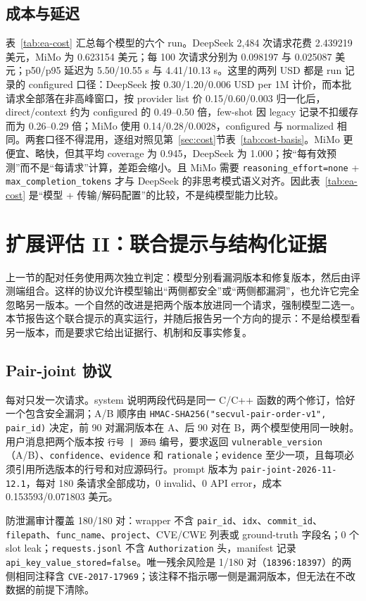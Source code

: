 \documentclass[conference]{IEEEtran}
\begin{document}
\subsection{成本与延迟}
表~\ref{tab:ea-cost} 汇总每个模型的六个 run。DeepSeek 2{,}484 次请求花费 2.439219 美元，MiMo 为 0.623154 美元；每 100 次请求分别为 0.098197 与 0.025087 美元；p50/p95 延迟为 5.50/10.55 s 与 4.41/10.13 s。这里的两列 USD 都是 run 记录的 configured 口径：DeepSeek 按 0.30/1.20/0.006 USD per 1M 计价，而本批请求全部落在非高峰窗口，按 provider list 价 0.15/0.60/0.003 归一化后，direct/context 约为 configured 的 0.49--0.50 倍，few-shot 因 legacy 记录不扣缓存而为 0.26--0.29 倍；MiMo 使用 0.14/0.28/0.0028，configured 与 normalized 相同。两套口径不得混用，逐组对照见第~\ref{sec:cost}节表~\ref{tab:cost-basis}。MiMo 更便宜、略快，但其平均 coverage 为 0.945，DeepSeek 为 1.000；按“每有效预测”而不是“每请求”计算，差距会缩小。且 MiMo 需要 \texttt{reasoning\_effort=none} + \texttt{max\_completion\_tokens} 才与 DeepSeek 的非思考模式语义对齐。因此表~\ref{tab:ea-cost} 是“模型 + 传输/解码配置”的比较，不是纯模型能力比较。

\section{扩展评估 II：联合提示与结构化证据}
\label{sec:ext-prompt}

上一节的配对任务使用两次独立判定：模型分别看漏洞版本和修复版本，然后由评测端组合。这样的协议允许模型输出“两侧都安全”或“两侧都漏洞”，也允许它完全忽略另一版本。一个自然的改进是把两个版本放进同一个请求，强制模型二选一。本节报告这个联合提示的真实运行，并随后报告另一个方向的提示：不是给模型看另一版本，而是要求它给出证据行、机制和反事实修复。

\subsection{Pair-joint 协议}
每对只发一次请求。system 说明两段代码是同一 C/C++ 函数的两个修订，恰好一个包含安全漏洞；A/B 顺序由 \texttt{HMAC-SHA256("secvul-pair-order-v1", pair\_id)} 决定，前 90 对漏洞版本在 A、后 90 对在 B，两个模型使用同一映射。用户消息把两个版本按 \texttt{行号 | 源码} 编号，要求返回 \texttt{vulnerable\_version}（A/B）、\texttt{confidence}、\texttt{evidence} 和 \texttt{rationale}；\texttt{evidence} 至少一项，且每项必须引用所选版本的行号和对应源码行。prompt 版本为 \texttt{pair-joint-2026-11-12.1}，每对 180 条请求全部成功，0 invalid、0 API error，成本 0.153593/0.071803 美元。

防泄漏审计覆盖 180/180 对：wrapper 不含 \texttt{pair\_id}、\texttt{idx}、\texttt{commit\_id}、\texttt{filepath}、\texttt{func\_name}、\texttt{project}、CVE/CWE 列表或 ground-truth 字段名；0 个 slot leak；\texttt{requests.jsonl} 不含 \texttt{Authorization} 头，manifest 记录 \texttt{api\_key\_value\_stored=false}。唯一残余风险是 1/180 对（\texttt{18396:18397}）的两侧相同注释含 \texttt{CVE-2017-17969}；该注释不指示哪一侧是漏洞版本，但无法在不改数据的前提下清除。
\end{document}
